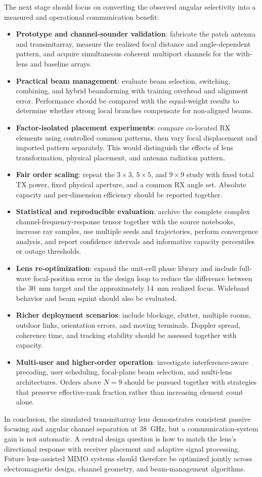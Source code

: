 The next stage should focus on converting the observed angular selectivity into a measured and operational communication benefit:
\begin{itemize}
    \item \textbf{Prototype and channel-sounder validation}: fabricate the patch antenna and transmitarray, measure the realized focal distance and angle-dependent pattern, and acquire simultaneous coherent multiport channels for the with-lens and baseline arrays.
    \item \textbf{Practical beam management}: evaluate beam selection, switching, combining, and hybrid beamforming with training overhead and alignment error. Performance should be compared with the equal-weight results to determine whether strong local branches compensate for non-aligned beams.
    \item \textbf{Factor-isolated placement experiments}: compare co-located RX elements using controlled common patterns, then vary focal displacement and imported pattern separately. This would distinguish the effects of lens transformation, physical placement, and antenna radiation pattern.
    \item \textbf{Fair order scaling}: repeat the $3\times3$, $5\times5$, and $9\times9$ study with fixed total TX power, fixed physical aperture, and a common RX angle set. Absolute capacity and per-dimension efficiency should be reported together.
    \item \textbf{Statistical and reproducible evaluation}: archive the complete complex channel-frequency-response tensor together with the source notebooks, increase ray samples, use multiple seeds and trajectories, perform convergence analysis, and report confidence intervals and informative capacity percentiles or outage thresholds.
    \item \textbf{Lens re-optimization}: expand the unit-cell phase library and include full-wave focal-position error in the design loop to reduce the difference between the 30~mm target and the approximately 14~mm realized focus. Wideband behavior and beam squint should also be evaluated.
    \item \textbf{Richer deployment scenarios}: include blockage, clutter, multiple rooms, outdoor links, orientation errors, and moving terminals. Doppler spread, coherence time, and tracking stability should be assessed together with capacity.
    \item \textbf{Multi-user and higher-order operation}: investigate interference-aware precoding, user scheduling, focal-plane beam selection, and multi-lens architectures. Orders above $N=9$ should be pursued together with strategies that preserve effective-rank fraction rather than increasing element count alone.
\end{itemize}

In conclusion, the simulated transmitarray lens demonstrates consistent passive focusing and angular channel separation at 38~GHz, but a communication-system gain is not automatic. A central design question is how to match the lens's directional response with receiver placement and adaptive signal processing. Future lens-assisted MIMO systems should therefore be optimized jointly across electromagnetic design, channel geometry, and beam-management algorithms.
